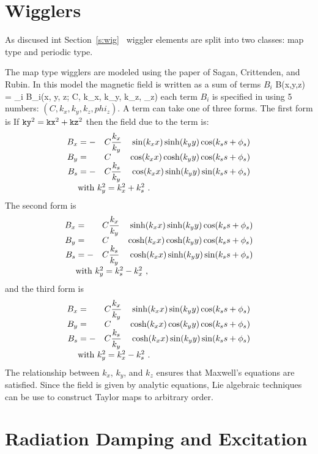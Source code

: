 \section{Wigglers}
\label{s:wiggler_phys}

As discused int Section~\ref{s:wig} \bmad\ wiggler elements are split into 
two classes: map type and periodic type.


The map type wigglers are modeled using the paper of Sagan, Crittenden, 
and Rubin\cite{b:scr}. In this model the magnetic field is written as 
a sum of terms $B_i$
\Begineq
  B(x,y,z) = \sum_i B_i(x, y, z; C, k_x, k_y, k_z, \phi_z)
\Endeq 
each term $B_i$ is specified in using 5 numbers: 
$(C, k_x, k_y, k_z, phi_z)$. A term can take one of three forms. The first
form is
If $\vn{ky}^2 = \vn{kx}^2 + \vn{kz}^2$ then the field due to the term is: 
\begin{alignat}{4}
  B_x &= -&C &\dfrac{k_x}{k_y} & \sin(\kxx) \sinh(\kyy) \cos(\ksss) \CRNEG
  B_y &=  &C &                 & \cos(\kxx) \cosh(\kyy) \cos(\ksss) \CRNEG
  B_s &= -&C &\dfrac{k_s}{k_y} & \cos(\kxx) \sinh(\kyy) \sin(\ksss) \CRneg
  & \makebox[1pt][l]{with $k_y^2 = k_x^2 + k_s^2$ .} &&&  \label{f1}
\end{alignat}
The second form is
\begin{alignat}{4}
  B_x &=  &C &\dfrac{k_x}{k_y} & \sinh(\kxx) \sinh(\kyy) \cos(\ksss) \CRNEG
  B_y &=  &C &                 & \cosh(\kxx) \cosh(\kyy) \cos(\ksss) \CRNEG
  B_s &= -&C &\dfrac{k_s}{k_y} & \cosh(\kxx) \sinh(\kyy) \sin(\ksss) \CRneg
  & \makebox[1pt][l]{with $k_y^2 = k_s^2 - k_x^2$ ,} &&&  \label{f2}
\end{alignat}
and the third form is
\begin{alignat}{4}
  B_x &=  &C &\dfrac{k_x}{k_y} & \sinh(\kxx) \sin(\kyy) \cos(\ksss) \CRNEG
  B_y &=  &C &                 & \cosh(\kxx) \cos(\kyy) \cos(\ksss) \CRNEG
  B_s &= -&C &\dfrac{k_s}{k_y} & \cosh(\kxx) \sin(\kyy) \sin(\ksss) \CRneg
  & \makebox[1pt][l]{with $k_y^2 = k_x^2 - k_s^2$ .} &&& \label{f3}
\end{alignat}
The relationship between $k_x$, $k_y$, and $k_z$ ensures that Maxwell's equations
are satisfied. Since the field is given by analytic equations, Lie algebraic
techniques can be use to construct Taylor maps to arbitrary order.

\section{Radiation Damping and Excitation}
\label{s:radiation}



